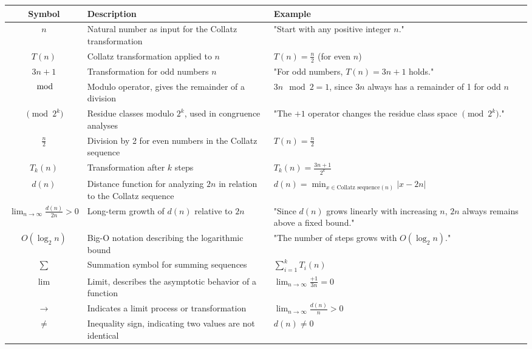 \documentclass[a4paper,12pt]{article}
\begin{document}
\begin{table}[h!]
    \centering
    \begin{tabular}{|c|p{7cm}|p{5cm}|}
    \hline
    \textbf{Symbol} & \textbf{Description} & \textbf{Example} \\ \hline
    \( n \) & Natural number as input for the Collatz transformation & "Start with any positive integer \( n \)." \\ \hline
    \( T(n) \) & Collatz transformation applied to \( n \) & \( T(n) = \frac{n}{2} \) (for even \( n \)) \\ \hline
    \( 3n + 1 \) & Transformation for odd numbers \( n \) & "For odd numbers, \( T(n) = 3n + 1 \) holds." \\ \hline
    \( \mod \) & Modulo operator, gives the remainder of a division & \( 3n \mod 2 = 1 \), since \( 3n \) always has a remainder of 1 for odd \( n \) \\ \hline
    \( \pmod{2^k} \) & Residue classes modulo \( 2^k \), used in congruence analyses & "The \(+1\) operator changes the residue class space \( \pmod{2^k} \)." \\ \hline
    \( \frac{n}{2} \) & Division by 2 for even numbers in the Collatz sequence & \( T(n) = \frac{n}{2} \) \\ \hline
    \( T_k(n) \) & Transformation after \( k \) steps & \( T_k(n) = \frac{3n + 1}{2^k} \) \\ \hline
    \( d(n) \) & Distance function for analyzing \( 2n \) in relation to the Collatz sequence & \( d(n) = \min_{x \in \text{Collatz sequence}(n)} |x - 2n| \) \\ \hline
    \( \lim_{n \to \infty} \frac{d(n)}{2n} > 0 \) & Long-term growth of \( d(n) \) relative to \( 2n \) & "Since \( d(n) \) grows linearly with increasing \( n \), \( 2n \) always remains above a fixed bound." \\ \hline
    \( O(\log_2 n) \) & Big-O notation describing the logarithmic bound & "The number of steps grows with \( O(\log_2 n) \)." \\ \hline
    \( \sum \) & Summation symbol for summing sequences & \( \sum_{i=1}^k T_i(n) \) \\ \hline
    \( \lim \) & Limit, describes the asymptotic behavior of a function & \( \lim_{n \to \infty} \frac{+1}{3n} = 0 \) \\ \hline
    \( \to \) & Indicates a limit process or transformation & \( \lim_{n \to \infty} \frac{d(n)}{n} > 0 \) \\ \hline
    \( \neq \) & Inequality sign, indicating two values are not identical & \( d(n) \neq 0 \) \\ \hline

\end{tabular}
\end{table}
\end{document}
